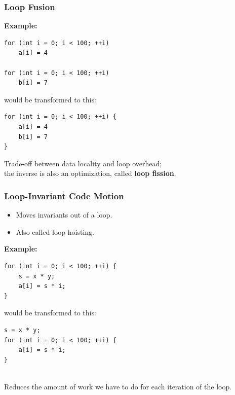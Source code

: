 \begin{frame}[fragile]
  \frametitle{Loop Fusion}

  
  {\bf Example:}
  \begin{lstlisting}
for (int i = 0; i < 100; ++i)
    a[i] = 4

for (int i = 0; i < 100; ++i)
    b[i] = 7
  \end{lstlisting}
  would be transformed to this:
  \begin{lstlisting}
for (int i = 0; i < 100; ++i) {
    a[i] = 4
    b[i] = 7
}
  \end{lstlisting}
  \vfill
  Trade-off  between data locality and loop overhead; \\ 
  the inverse is also an optimization, called {\bf loop fission}.
  
\end{frame}

\begin{frame}[fragile]
  \frametitle{Loop-Invariant Code Motion}
  
  
  \begin{itemize}
    \item Moves invariants out of a loop.
    \item Also called loop hoisting.
  \end{itemize}

  {\bf Example:}
  \begin{lstlisting}
for (int i = 0; i < 100; ++i) {
    s = x * y;
    a[i] = s * i;
}
  \end{lstlisting}
  would be transformed to this:
  \begin{lstlisting}
s = x * y;
for (int i = 0; i < 100; ++i) {
    a[i] = s * i;
}
  \end{lstlisting}
~\\
  Reduces the amount of work we have to do for each iteration of the loop.
  
\end{frame}

